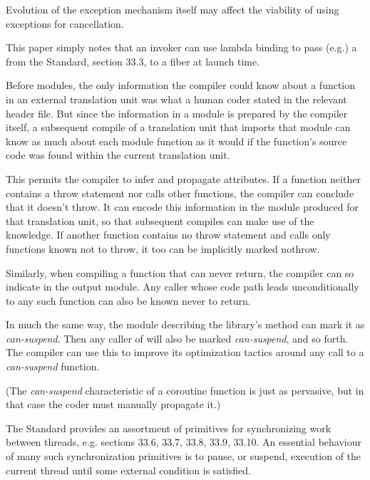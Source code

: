 Evolution of the exception mechanism itself\cite{P0709R4} may affect the
viability of using exceptions for cancellation.

This paper simply notes that an invoker can use lambda binding to pass (e.g.)
a  from the Standard\cite{Standard}, section 33.3, to a
fiber at launch time.


Before modules, the only information the compiler could know about a function
in an external translation unit was what a human coder stated in the relevant
header file. But since the information in a module is prepared by the compiler
itself, a subsequent compile of a translation unit that imports that module
can know as much about each module function as it would if the function's
source code was found within the current translation unit.

This permits the compiler to infer and propagate attributes. If a function
neither contains a throw statement nor calls other functions, the compiler can
conclude that it doesn't throw. It can encode this information in the module
produced for that translation unit, so that subsequent compiles can make use
of the knowledge. If another function contains no throw statement and calls
only functions known not to throw, it too can be implicitly marked nothrow.

Similarly, when compiling a function that can never return, the compiler can
so indicate in the output module. Any caller whose code path leads
unconditionally to any such function can also be known never to return.

In much the same way, the module describing the
library's \fiber\cpp{::}\resumewith method can mark it as \emph{can-suspend}.
Then any caller of \resumewith will also be marked \emph{can-suspend}, and so
forth. The compiler can use this to improve its optimization tactics around
any call to a \emph{can-suspend} function.

(The \emph{can-suspend} characteristic of a  coroutine function
is just as pervasive, but in that case the coder must manually propagate it.)


The Standard\cite{Standard} provides an assortment of primitives for
synchronizing work between threads, e.g. sections 33.6, 33.7, 33.8, 33.9,
33.10. An essential behaviour of many such synchronization primitives is to
pause, or suspend, execution of the current thread until some external
condition is satisfied.

